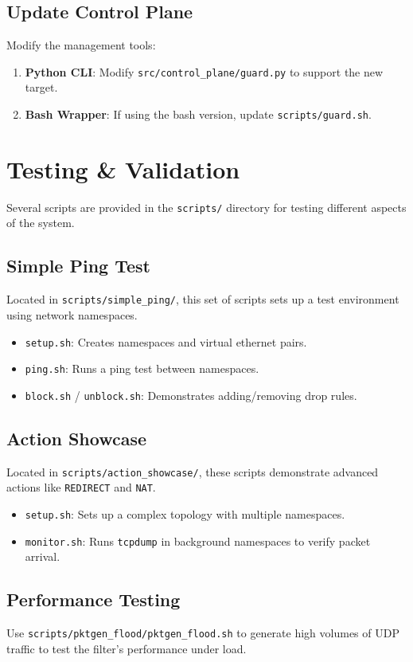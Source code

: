 \documentclass[11pt,a4paper]{report}
\begin{document}
\section{Update Control Plane}
Modify the management tools:
\begin{enumerate}
    \item \textbf{Python CLI}: Modify \texttt{src/control\_plane/guard.py} to support the new target.
    \item \textbf{Bash Wrapper}: If using the bash version, update \texttt{scripts/guard.sh}.
\end{enumerate}

\chapter{Testing \& Validation}

Several scripts are provided in the \texttt{scripts/} directory for testing different aspects of the system.

\section{Simple Ping Test}
Located in \texttt{scripts/simple\_ping/}, this set of scripts sets up a test environment using network namespaces.
\begin{itemize}
    \item \texttt{setup.sh}: Creates namespaces and virtual ethernet pairs.
    \item \texttt{ping.sh}: Runs a ping test between namespaces.
    \item \texttt{block.sh} / \texttt{unblock.sh}: Demonstrates adding/removing drop rules.
\end{itemize}

\section{Action Showcase}
Located in \texttt{scripts/action\_showcase/}, these scripts demonstrate advanced actions like \texttt{REDIRECT} and \texttt{NAT}.
\begin{itemize}
    \item \texttt{setup.sh}: Sets up a complex topology with multiple namespaces.
    \item \texttt{monitor.sh}: Runs \texttt{tcpdump} in background namespaces to verify packet arrival.
\end{itemize}

\section{Performance Testing}
Use \texttt{scripts/pktgen\_flood/pktgen\_flood.sh} to generate high volumes of UDP traffic to test the filter's performance under load.
\end{document}
